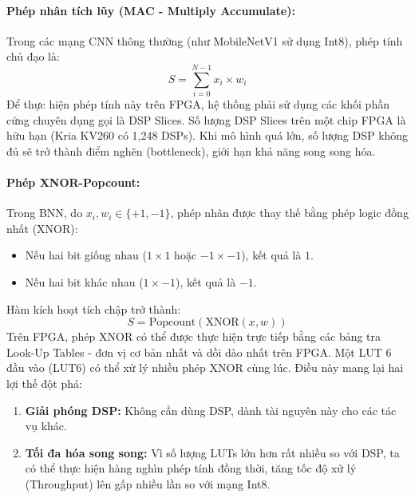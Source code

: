 \paragraph{Phép nhân tích lũy (MAC - Multiply Accumulate):}
Trong các mạng CNN thông thường (như MobileNetV1 sử dụng Int8), phép tính chủ đạo là:
\begin{equation}
    S = \sum_{i=0}^{N-1} x_i \times w_i
\end{equation}
Để thực hiện phép tính này trên FPGA, hệ thống phải sử dụng các khối phần cứng chuyên dụng gọi là DSP Slices. Số lượng DSP Slices trên một chip FPGA là hữu hạn (Kria KV260 có 1,248 DSPs). Khi mô hình quá lớn, số lượng DSP không đủ sẽ trở thành điểm nghẽn (bottleneck), giới hạn khả năng song song hóa.

\paragraph{Phép XNOR-Popcount:}
Trong BNN, do $x_i, w_i \in \{+1, -1\}$, phép nhân được thay thế bằng phép logic đồng nhất (XNOR):
\begin{itemize}
    \item Nếu hai bit giống nhau ($1 \times 1$ hoặc $-1 \times -1$), kết quả là $1$.
    \item Nếu hai bit khác nhau ($1 \times -1$), kết quả là $-1$.
\end{itemize}
Hàm kích hoạt tích chập trở thành:
\begin{equation}
    S = \text{Popcount}(\text{XNOR}(x, w))
\end{equation}
Trên FPGA, phép XNOR có thể được thực hiện trực tiếp bằng các bảng tra Look-Up Tables - đơn vị cơ bản nhất và dồi dào nhất trên FPGA. Một LUT 6 đầu vào (LUT6) có thể xử lý nhiều phép XNOR cùng lúc.
Điều này mang lại hai lợi thế đột phá:
\begin{enumerate}
    \item \textbf{Giải phóng DSP:} Không cần dùng DSP, dành tài nguyên này cho các tác vụ khác.
    \item \textbf{Tối đa hóa song song:} Vì số lượng LUTs lớn hơn rất nhiều so với DSP, ta có thể thực hiện hàng nghìn phép tính đồng thời, tăng tốc độ xử lý (Throughput) lên gấp nhiều lần so với mạng Int8.
\end{enumerate}


